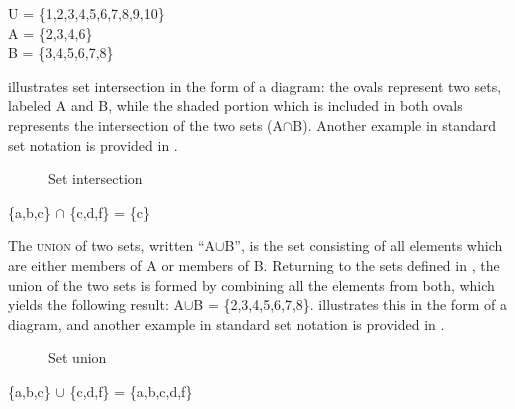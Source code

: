 \ea \label{ex:13.14}
U = \{1,2,3,4,5,6,7,8,9,10\}\\
A = \{2,3,4,6\}\\
B = \{3,4,5,6,7,8\}
\z


 illustrates set intersection in the form of a diagram: the ovals represent two sets, labeled A and B, while the shaded portion which is included in both ovals represents the intersection of the two sets (A${\cap}$B). Another example in standard set notation is provided in .

\begin{figure}
 


\caption{\label{fig:13:2} Set intersection}
\end{figure}

\ea \label{ex:13.15}
\{a,b,c\} ${\cap}$ \{c,d,f\} = \{c\}
\z


The \textsc{union} of two sets, written “A${\cup}$B”, is the set consisting of all elements which are either members of A or members of B. Returning to the sets defined in , the union of the two sets is formed by combining all the elements from both, which yields the following result: A${\cup}$B = \{2,3,4,5,6,7,8\}.  illustrates this in the form of a diagram, and another example in standard set notation is provided in .


\begin{figure}

\caption{\label{fig:13:3} Set union}
\end{figure}

\ea \label{ex:13.16}
\{a,b,c\} ${\cup}$ \{c,d,f\} = \{a,b,c,d,f\}
\z



